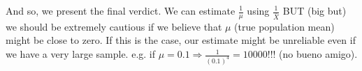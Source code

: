 \vspace{0.2cm}

And so, we present the final verdict. We can estimate $\frac{1}{\mu}$ using $\frac{1}{\bar{X}}$ BUT (big but) we should be extremely cautious if we believe that $\mu$ (true population mean)
might be close to zero. If this is the case, our estimate might be unreliable even if we have a very large sample. e.g. if $\mu = 0.1 \Rightarrow \frac{1}{(0.1)^4} = 10000$!!! (no bueno amigo).
